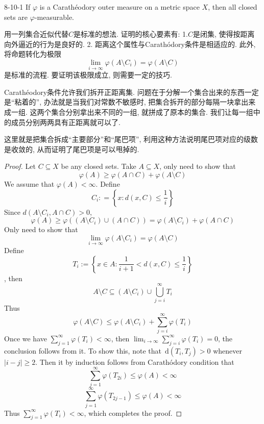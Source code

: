 \documentclass[../main.tex]{subfiles}
\begin{document}
\begin{theorem}{}{8-10-1}
    If \(   \varphi   \) is a Carath\'eodory outer measure on a metric space \(  X  \), then all closed sets are \(   \varphi   \)-measurable.    
\end{theorem}
\begin{proofsketch}
    用一列集合近似代替\(  C  \)是标准的想法. 证明的核心要素有: 1.\(  C  \)是闭集, 使得按距离向外逼近的行为是良好的. 2. 距离这个属性与Carath\'odory条件是相适应的.   此外, 将命题转化为极限 \[
    \lim_{i \to \infty}  \varphi \left( A\setminus C_{i} \right)=  \varphi \left( A\setminus C \right)  
    \]是标准的流程. 要证明该极限成立, 则需要一定的技巧. 

    Carath\'eodory条件允许我们拆开正距离集. 问题在于分解一个集合出来的东西一定是``粘着的'', 办法就是当我们对常数不敏感时, 把集合拆开的部分每隔一块拿出来成一组. 这两个集合分别拿出来不同的一组, 就拼成了原本的集合. 我们让每一组中的成员分别两两具有正距离就可以了.

    这里就是把集合拆成``主要部分''和``尾巴项'', 利用这种方法说明尾巴项对应的级数是收敛的, 从而证明了尾巴项是可以甩掉的.
\end{proofsketch}
\begin{proof}
    Let \(  C \subseteq X  \) be any closed sets. Take \(  A \subseteq X  \), only need to show that \[
     \varphi \left( A \right)\ge  \varphi \left( A\cap C \right) +  \varphi \left( A\setminus C \right)   
    \]We assume that \(   \varphi \left( A \right)< \infty   \).  Define \[
    C_{i}: = \left\{ x: d\left( x,C \right)\le \frac{1 }{i }   \right\}
    \] Since \(  d\left( A\setminus C_{i}, A\cap C \right)   > 0\),  \[
     \varphi \left( A \right)\ge   \varphi \left( \left( A\setminus C_{i} \right)\cup \left( A\cap C \right)   \right)=   \varphi \left( A\setminus C_{i} \right)+  \varphi \left( A\cap C \right)    
    \] Only need to show that \[
    \lim_{i \to \infty}  \varphi \left( A\setminus C_{i} \right)=  \varphi \left( A\setminus C \right)  
    \] Define \[
    T_{i}:=  \left\{ x \in A: \frac{1 }{i+ 1 }< d\left( x,C \right)\le \frac{1 }{i }    \right\}
    \], then \[
    A\setminus C\subseteq  \left( A\setminus C_{i} \right)\cup \bigcup _{j = i}^{\infty}T_{i} 
    \] Thus \[
     \varphi \left( A\setminus C \right)\le  \varphi \left( A\setminus C_{i} \right)+ \sum _{j = i}^{\infty} \varphi \left( T_{i} \right)   
    \] Once we have \(  \sum _{j= 1}^{\infty} \varphi \left( T_{i} \right)< \infty   \), then \(  \lim_{i\to \infty}\sum _{j = i}^{\infty} \varphi \left( T_{i} \right)= 0   \),  the conclusion follows from it. To show this, note that \(  \,\mathrm{d} \left( T_{i},T_{j} \right)> 0   \) whenever \(  \left| i-j \right|\ge 2   \). Then it by induction follows from Carath\'odory condition that \[
    \sum _{ j= 1}^{\infty} \varphi \left( T_{2i} \right) \le  \varphi \left( A \right) < \infty
    \] \[
    \sum _{j = 1}^{\infty} \varphi \left( T_{2j-1} \right)\le  \varphi \left( A \right) < \infty 
    \]    Thus \(  \sum _{j = 1}^{\infty} \varphi \left( T_{i} \right)< \infty   \), which completes the proof.  
\end{proof}
\end{document}
